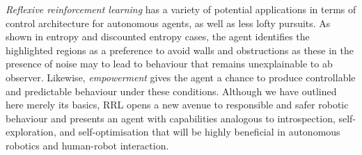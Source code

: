 \documentclass{article}
\begin{document}
\emph{Reflexive reinforcement learning}
has a variety of potential applications in terms of control architecture for autonomous agents, as well as less lofty pursuits. 
As shown in entropy and discounted entropy cases, the agent identifies the 
highlighted regions as a preference to avoid walls and obstructions as these in the presence of
noise may to lead to behaviour that remains unexplainable to ab observer. Likewise, \emph{empowerment} gives the agent a chance to produce controllable and predictable behaviour under these conditions. Although we have outlined here merely its basics,  RRL opens a new avenue to responsible and safer robotic behaviour and presents an agent with capabilities analogous to introspection, self-exploration, and self-optimisation that will be highly beneficial in autonomous robotics and 
human-robot interaction.






\end{document}
